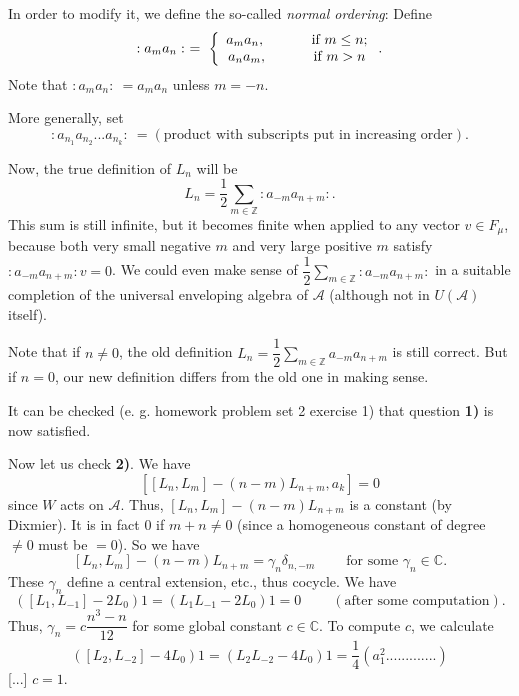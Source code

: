 \documentclass
[numbers=enddot,12pt,final,onecolumn,german,notitlepage]{scrartcl}%
\theoremstyle{definition}
\begin{document}
In order to modify it, we define the so-called \textit{normal ordering}:
Define%
\[
:a_{m}a_{n}:\ =\ \left\{
\begin{array}
[c]{c}%
a_{m}a_{n},\ \ \ \ \ \ \ \ \ \ \text{if }m\leq n;\\
a_{n}a_{m},\ \ \ \ \ \ \ \ \ \ \text{if }m>n
\end{array}
\right.  .
\]
Note that $:a_{m}a_{n}:\ =a_{m}a_{n}$ unless $m=-n$.

More generally, set%
\[
:a_{n_{1}}a_{n_{2}}...a_{n_{k}}:\ =\left(  \text{product with subscripts put
in increasing order}\right)  .
\]


Now, the true definition of $L_{n}$ will be%
\[
L_{n}=\dfrac{1}{2}\sum\limits_{m\in\mathbb{Z}}:a_{-m}a_{n+m}:.
\]
This sum is still infinite, but it becomes finite when applied to any vector
$v\in F_{\mu}$, because both very small negative $m$ and very large positive
$m$ satisfy $:a_{-m}a_{n+m}:v=0$. We could even make sense of $\dfrac{1}%
{2}\sum\limits_{m\in\mathbb{Z}}:a_{-m}a_{n+m}:$ in a suitable completion of
the universal enveloping algebra of $\mathcal{A}$ (although not in $U\left(
\mathcal{A}\right)  $ itself).

Note that if $n\neq0$, the old definition $L_{n}=\dfrac{1}{2}\sum
\limits_{m\in\mathbb{Z}}a_{-m}a_{n+m}$ is still correct. But if $n=0$, our new
definition differs from the old one in making sense.

It can be checked (e. g. homework problem set 2 exercise 1) that question
\textbf{1)} is now satisfied.

Now let us check \textbf{2)}. We have%
\[
\left[  \left[  L_{n},L_{m}\right]  -\left(  n-m\right)  L_{n+m},a_{k}\right]
=0
\]
since $W$ acts on $\mathcal{A}$. Thus, $\left[  L_{n},L_{m}\right]  -\left(
n-m\right)  L_{n+m}$ is a constant (by Dixmier). It is in fact $0$ if
$m+n\neq0$ (since a homogeneous constant of degree $\neq0$ must be $=0$). So
we have%
\[
\left[  L_{n},L_{m}\right]  -\left(  n-m\right)  L_{n+m}=\gamma_{n}%
\delta_{n,-m}\ \ \ \ \ \ \ \ \ \ \text{for some }\gamma_{n}\in\mathbb{C}.
\]
These $\gamma_{n}$ define a central extension, etc., thus cocycle. We have%
\[
\left(  \left[  L_{1},L_{-1}\right]  -2L_{0}\right)  1=\left(  L_{1}%
L_{-1}-2L_{0}\right)  1=0\ \ \ \ \ \ \ \ \ \ \left(  \text{after some
computation}\right)  .
\]
Thus, $\gamma_{n}=c\dfrac{n^{3}-n}{12}$ for some global constant
$c\in\mathbb{C}$. To compute $c$, we calculate%
\[
\left(  \left[  L_{2},L_{-2}\right]  -4L_{0}\right)  1=\left(  L_{2}%
L_{-2}-4L_{0}\right)  1=\dfrac{1}{4}\left(  a_{1}^{2}.............\right)
\]
[...] $c=1$.
\end{document}
